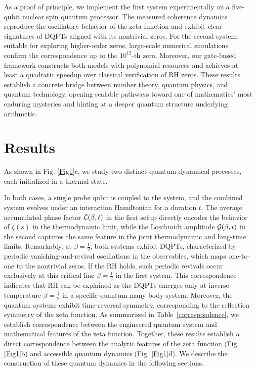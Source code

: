 \documentclass[aps,pra,twocolumn,superscriptaddress,preprintnumbers,amsmath,amssymb]{revtex4-2}
\begin{document}
As a proof of principle, we %
implement the first system experimentally on a five-qubit nuclear spin quantum processor. The measured coherence dynamics %
reproduce the oscillatory behavior of the zeta function and exhibit clear signatures of DQPTs aligned with its nontrivial zeros. For the second system, suitable for exploring higher-order zeros, large-scale numerical simulations confirm the correspondence up to the $10^{12}$-th zero. 
Moreover, our gate-based framework constructs both models with polynomial resources and achieves at least a quadratic speedup over classical verification of RH zeros. These results establish a concrete bridge between number theory, quantum physics, and quantum technology, opening scalable  pathways toward one of mathematics' most enduring mysteries and hinting at a deeper quantum structure underlying arithmetic.





\section{Results}


As shown in Fig. \ref{Fig1}c, we study two distinct quantum dynamical processes, each initialized in a thermal state.

In both cases,
a single probe qubit is coupled to the system, and the combined system evolves under an interaction Hamiltonian for a duration $t$.  The average accumulated phase factor ${\cal L}(\beta,t)$ in the first setup directly encodes the behavior of $\zeta(s)$ in the thermodynamic limit, while the Loschmidt amplitude ${\cal G}(\beta,t)$ in the second  captures the same feature in the joint thermodynamic and long-time limits. Remarkably, at $\beta = \frac{1}{2}$, both systems exhibit  DQPTs, characterized by periodic vanishing-and-revival oscillations in the observables, which maps one-to-one to the nontrivial zeros. If the RH holds, such periodic revivals occur exclusively at this critical line $\beta = \frac{1}{2}$ in the first system. 
This  correspondence indicates that RH can be explained as the  DQPTs  emerges only at inverse temperature  $\beta = \frac{1}{2}$ in a  specific quantum many body system. Moreover, the quantum systems exhibit time-reversal symmetry, corresponding to the reflection symmetry of the zeta function. As summarized in Table~\ref{correspondence}, we establish correspondence between  the engineered quantum system and mathematical features of the zeta function. 
Together, these results establish a direct correspondence between the analytic features of the zeta function (Fig. \ref{Fig1}b) and accessible quantum dynamics (Fig. \ref{Fig1}d). 
We describe the construction of these quantum dynamics in the following sections.
\end{document}
